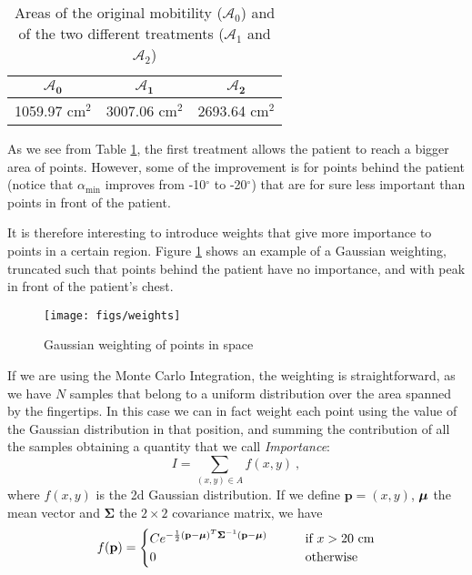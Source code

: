 \begin{table}[!h]
\begin{center}
\begin{tabular}{|c|c|c|}
\hline
\bf $\mathbf{\mathcal{A}_0}$ & \bf $\mathbf{\mathcal{A}_1}$ & \bf $\mathbf{\mathcal{A}_2}$ \\  \hline

1059.97 cm$^2$ & 3007.06 cm$^2$ &   2693.64 cm$^2$ \\\hline

\end{tabular}
\caption{Areas of the original mobitility ($\mathcal{A}_0$) and of the two different treatments ($\mathcal{A}_1$ and $\mathcal{A}_2$)}
\label{tab:ex}
\end{center}
\end{table}

As we see from Table \ref{tab:ex}, the first treatment allows the patient to reach a bigger area of points. However, some of the improvement is for points behind the patient (notice that $\alpha_{\text{min}}$ improves from -10$^\circ$ to -20$^\circ$) that are for sure less important than points in front of the patient.

It is therefore interesting to introduce weights that give more importance to points in a certain region. Figure \ref{fig:w} shows an example of a Gaussian weighting, truncated such that points behind the patient have no importance, and with peak in front of the patient's chest.

\begin{figure}[!ht]
  \centering
  \texttt{[image: figs/weights]}
\caption{Gaussian weighting of points in space}
\label{fig:w}
\end{figure}

If we are using the Monte Carlo Integration, the weighting is straightforward, as we have $N$ samples that belong to a uniform distribution over the area spanned by the fingertips. 
In this case we can in fact weight each point using the value of the Gaussian distribution in that position, and summing the contribution of all the samples obtaining a quantity that we call \textit{Importance}:
$$
I=\sum_{(x,y)\in A} f(x,y) \ ,
$$
where $f(x,y)$ is the 2d Gaussian distribution. If we define $\mathbf{p}=(x,y)$, $\text{\boldmath $\mu$}$ the mean vector and $\mathbf{\Sigma}$ the $2\times 2$ covariance matrix, we have
$$
f(\mathbf{p})=
\begin{cases}
Ce^{-\frac{1}{2}(\mathbf{p}-\text{\boldmath $\mu$})^T\mathbf{\Sigma}^{-1}(\mathbf{p}-\text{\boldmath $\mu$})} \qquad & \text{if } x>20\text{ cm} \\
0 & \text{otherwise}
\end{cases}
$$





